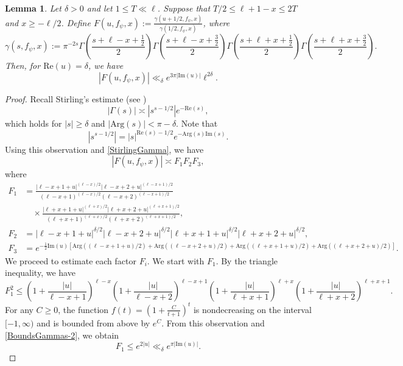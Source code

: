 \documentclass[11pt]{amsart}
\newtheorem{lemma}[theorem]{Lemma}
\theoremstyle{definition}
\theoremstyle{remark}
\begin{document}
\begin{lemma}\label{BoundsGammas}
Let $\delta >0$ and let $1\leq T \ll \ell$. Suppose that $T/2 \leq \ell+1-x \leq 2T$ and $x\geq -\ell/2$. Define $F(u,f_{\psi},x) := \frac{\gamma(u+1/2,f_{\psi},x)}{\gamma(1/2,f_{\psi},x)}$, where $$ \gamma(s,f_{\psi},x) := \pi^{-2s} \Gamma\left( \frac{s+\ell-x+\frac{1}{2}}{2} \right) \Gamma\left( \frac{s+\ell-x+\frac{3}{2}}{2} \right) \Gamma\left( \frac{s+\ell+x+\frac{1}{2}}{2} \right) \Gamma\left( \frac{s+\ell+x+\frac{3}{2}}{2} \right).$$ Then, for $\mathrm{Re}(u) = \delta$, we have $$ |F(u,f_{\psi},x)| \ll_{\delta} e^{3\pi |\mathrm{Im}(u)|} \ell^{2\delta}.$$
\end{lemma}

\begin{proof}
Recall Stirling's estimate (see \cite[Thm. C.1]{MontgomeryVaughan})
\begin{equation}
    |\Gamma(s)| \asymp \left|s^{s-1/2}\right| e^{-\mathrm{Re}(s)}, \label{StirlingGamma}
\end{equation}
which holds for $|s|\geq \delta$ and $|\mathrm{Arg}(s)| < \pi-\delta$. Note that $$ \left| s^{s-1/2} \right| = |s|^{\mathrm{Re}(s)-1/2} e^{-\mathrm{Arg}(s) \mathrm{Im}(s)}.$$ Using this observation and \eqref{StirlingGamma}, we have
\begin{equation}
    |F(u,f_{\psi},x)| \asymp F_1 F_2 F_3, \label{BoundsGammas-1}
\end{equation}
where
\begin{align*}
    F_1 &= \frac{|\ell-x+1+u|^{(\ell-x)/2} |\ell-x+2+u|^{(\ell-x+1)/2} }{(\ell-x+1)^{(\ell-x)/2} (\ell-x+2)^{(\ell-x+1)/2} } \\
    &\quad \times \frac{|\ell+x+1+u|^{(\ell+x)/2} |\ell+x+2+u|^{(\ell+x+1)/2}}{(\ell+x+1)^{(\ell+x)/2} (\ell+x+2)^{(\ell+x+1)/2}}, \\
    F_2 &= |\ell-x+1+u|^{\delta/2} |\ell-x+2+u|^{\delta/2} |\ell+x+1+u|^{\delta/2} |\ell+x+2+u|^{\delta/2}, \\
    F_3 &= e^{-\frac{1}{2}\mathrm{Im}(u) \left[ \mathrm{Arg}((\ell-x+1+u)/2) + \mathrm{Arg}((\ell-x+2+u)/2) + \mathrm{Arg}((\ell+x+1+u)/2) + \mathrm{Arg}((\ell+x+2+u)/2) \right]}.
\end{align*}
We proceed to estimate each factor $F_i$. We start with $F_1$. By the triangle inequality, we have
\begin{equation}
    F_{1}^2 \leq \left( 1+\frac{|u|}{\ell-x+1} \right)^{\ell-x} \left( 1+\frac{|u|}{\ell-x+2} \right)^{\ell-x+1} \left( 1+\frac{|u|}{\ell+x+1} \right)^{\ell+x} \left( 1+\frac{|u|}{\ell+x+2} \right)^{\ell+x+1}. \label{BoundsGammas-2}
\end{equation}
For any $C\geq 0$, the function $f(t) = \left( 1+\frac{C}{t+1}\right)^t$ is nondecreasing on the interval $[-1,\infty)$ and is bounded from above by $e^C$. From this observation and \eqref{BoundsGammas-2}, we obtain
\begin{equation}
    F_{1} \leq e^{2|u|} \ll_{\delta} e^{\pi |\mathrm{Im}(u)|}. \label{BoundsGammas-3}
\end{equation}


\end{proof}
\end{document}
